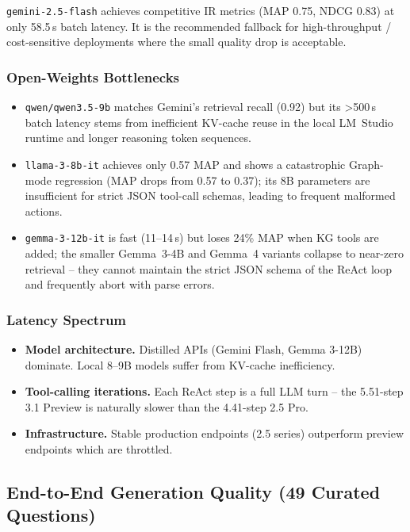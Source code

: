 \documentclass[11pt, a4paper]{article}
\begin{document}
\texttt{gemini-2.5-flash} achieves competitive IR metrics (MAP 0.75, NDCG 0.83) at only 58.5\,s batch latency. It is the recommended fallback for high-throughput / cost-sensitive deployments where the small quality drop is acceptable.

\subsubsection{Open-Weights Bottlenecks}

\begin{itemize}[leftmargin=*]
    \item \texttt{qwen/qwen3.5-9b} matches Gemini's retrieval recall (0.92) but its >500\,s batch latency stems from inefficient KV-cache reuse in the local LM~Studio runtime and longer reasoning token sequences.
    \item \texttt{llama-3-8b-it} achieves only 0.57 MAP and shows a catastrophic Graph-mode regression (MAP drops from 0.57 to 0.37); its 8B parameters are insufficient for strict JSON tool-call schemas, leading to frequent malformed actions.
    \item \texttt{gemma-3-12b-it} is fast (11--14\,s) but loses 24\% MAP when KG tools are added; the smaller Gemma~3-4B and Gemma~4 variants collapse to near-zero retrieval -- they cannot maintain the strict JSON schema of the ReAct loop and frequently abort with parse errors.
\end{itemize}

\subsubsection{Latency Spectrum}

\begin{itemize}[leftmargin=*]
    \item \textbf{Model architecture.} Distilled APIs (Gemini Flash, Gemma 3-12B) dominate. Local 8--9B models suffer from KV-cache inefficiency.
    \item \textbf{Tool-calling iterations.} Each ReAct step is a full LLM turn -- the 5.51-step 3.1 Preview is naturally slower than the 4.41-step 2.5 Pro.
    \item \textbf{Infrastructure.} Stable production endpoints (2.5 series) outperform preview endpoints which are throttled.
\end{itemize}

\subsection{End-to-End Generation Quality (49 Curated Questions)}
\end{document}
